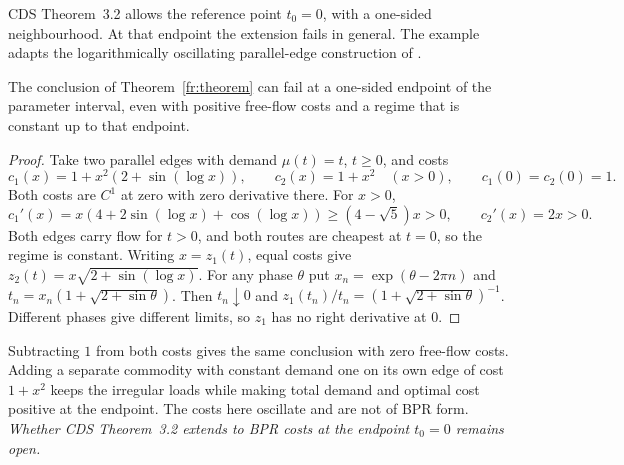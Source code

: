 CDS Theorem~3.2 allows the reference point $t_0=0$, with a one-sided neighbourhood. At that endpoint the extension fails in general. The example adapts the logarithmically oscillating parallel-edge construction of \cite[Section~3.2]{CB2020}.

\begin{proposition}\label{fr:endpoint}
The conclusion of Theorem~\ref{fr:theorem} can fail at a one-sided endpoint of the parameter interval, even with positive free-flow costs and a regime that is constant up to that endpoint.
\end{proposition}
\begin{proof}
Take two parallel edges with demand $\mu(t)=t$, $t\ge0$, and costs
\[
 c_1(x)=1+x^2(2+\sin(\log x)),\qquad c_2(x)=1+x^2\quad(x>0),
 \qquad c_1(0)=c_2(0)=1.
\]
Both costs are $C^1$ at zero with zero derivative there. For $x>0$,
\[
 c_1'(x)=x(4+2\sin(\log x)+\cos(\log x))\ge(4-\sqrt5)x>0,\qquad c_2'(x)=2x>0.
\]
Both edges carry flow for $t>0$, and both routes are cheapest at $t=0$, so the regime is constant. Writing $x=z_1(t)$, equal costs give $z_2(t)=x\sqrt{2+\sin(\log x)}$. For any phase $\theta$ put $x_n=\exp(\theta-2\pi n)$ and $t_n=x_n(1+\sqrt{2+\sin\theta})$. Then $t_n\downarrow0$ and $z_1(t_n)/t_n=(1+\sqrt{2+\sin\theta})^{-1}$. Different phases give different limits, so $z_1$ has no right derivative at $0$.
\end{proof}

Subtracting $1$ from both costs gives the same conclusion with zero free-flow costs. Adding a separate commodity with constant demand one on its own edge of cost $1+x^2$ keeps the irregular loads while making total demand and optimal cost positive at the endpoint. The costs here oscillate and are not of BPR form. \emph{Whether CDS Theorem~3.2 extends to BPR costs at the endpoint $t_0=0$ remains open.}

